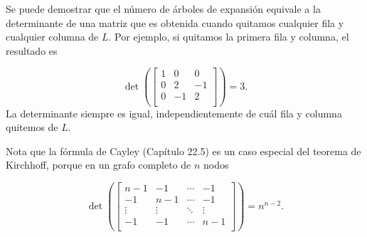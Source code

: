 Se puede demostrar que el número de árboles de expansión equivale a
la determinante de una matriz que es obtenida cuando quitamos cualquier
fila y cualquier columna de $L$. Por ejemplo, si quitamos la primera fila
y columna, el resultado es

\[ \det(
    \begin{bmatrix}
            1 & 0  & 0  \\
            0 & 2  & -1 \\
            0 & -1 & 2  \\
        \end{bmatrix}
    ) =3.\]
La determinante siempre es igual, independientemente de cuál fila y columna
quitemos de $L$.

Nota que la fórmula de Cayley (Capítulo 22.5) es un caso especial del teorema
de Kirchhoff, porque en un grafo completo de $n$ nodos

\[ \det(
    \begin{bmatrix}
            n-1    & -1     & \cdots & -1     \\
            -1     & n-1    & \cdots & -1     \\
            \vdots & \vdots & \ddots & \vdots \\
            -1     & -1     & \cdots & n-1    \\
        \end{bmatrix}
    ) =n^{n-2}.\]



